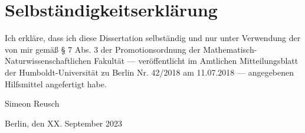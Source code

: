 \chapter*{Selbständigkeitserklärung}\label{bla}

Ich erkläre, dass ich diese Dissertation selbständig und nur unter Verwendung der von mir gemäß § 7 Abs. 3 der Promotionsordnung der Mathematisch-Naturwissenschaftlichen Fakultät --- veröffentlicht im Amtlichen Mitteilungsblatt der Humboldt-Universität zu Berlin Nr. 42/2018 am 11.07.2018 --- angegebenen Hilfsmittel angefertigt habe.

\vspace{18mm}
\begin{minipage}{2in}
    Simeon Reusch
\end{minipage}
\hfill
\begin{minipage}{2in}
    Berlin, den XX. September 2023
\end{minipage}